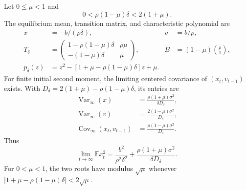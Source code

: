 \begin{theorem}
\label{thm:modal-tracking-covariance}
Let $0\le\mu<1$ and
\begin{equation}
 0<\rho(1-\mu)\delta<2(1+\mu).
 \label{eq:modal-schur}
\end{equation}
The equilibrium mean, transition matrix, and characteristic polynomial are
\begin{align}
 \bar x&=-b/(\rho\delta),&\bar v&=b/\rho,\\
 T_\delta&=\begin{pmatrix}
 1-\rho(1-\mu)\delta&\rho\mu\\
 -(1-\mu)\delta&\mu
 \end{pmatrix},&
 B&=(1-\mu)\binom{\rho}{1},\\
 p_\delta(z)&=z^2-[1+\mu-\rho(1-\mu)\delta]z+\mu.
\end{align}
For finite initial second moment, the limiting centered covariance of
$(x_t,v_{t-1})$ exists. With
$D_\delta=2(1+\mu)-\rho(1-\mu)\delta$, its entries are
\begin{align}
 \operatorname{Var}_\infty(x)
 &=\frac{\rho(1+\mu)\sigma^2}{\delta D_\delta},\label{eq:exact-modal-variance}\\
 \operatorname{Var}_\infty(v)
 &=\frac{2(1-\mu)\sigma^2}{D_\delta},\\
 \operatorname{Cov}_\infty(x_t,v_{t-1})
 &=\frac{\rho(1-\mu)\sigma^2}{D_\delta}.
 \label{eq:modal-cross-covariance}
\end{align}
Thus
\begin{equation}
 \lim_{t\to\infty}\mathbb E x_t^2
 =\frac{b^2}{\rho^2\delta^2}
  +\frac{\rho(1+\mu)\sigma^2}{\delta D_\delta}.
 \label{eq:modal-drift-plus-noise}
\end{equation}
For $0<\mu<1$, the two roots have modulus $\sqrt\mu$ whenever
$|1+\mu-\rho(1-\mu)\delta|<2\sqrt\mu$.
\end{theorem}
